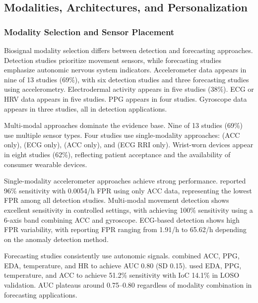 \subsection{Modalities, Architectures, and Personalization}

\subsubsection{Modality Selection and Sensor Placement}

Biosignal modality selection differs between detection and forecasting approaches. Detection studies prioritize movement sensors, while forecasting studies emphasize autonomic nervous system indicators. Accelerometer data appears in nine of 13 studies (69\%), with six detection studies and three forecasting studies using accelerometry. Electrodermal activity appears in five studies (38\%). ECG or HRV data appears in five studies. PPG appears in four studies. Gyroscope data appears in three studies, all in detection applications.

Multi-modal approaches dominate the evidence base. Nine of 13 studies (69\%) use multiple sensor types. Four studies use single-modality approaches: \textcite{spahrDeepLearningbasedDetection2025} (ACC only), \textcite{reintjesECGBasedDetectionEpileptic2025} (ECG only), \textcite{borujenyDetectionEpilepticSeizure2013} (ACC only), and \textcite{odeDevelopmentEpilepticSeizure2023} (ECG RRI only). Wrist-worn devices appear in eight studies (62\%), reflecting patient acceptance and the availability of consumer wearable devices.

Single-modality accelerometer approaches achieve strong performance. \textcite{spahrDeepLearningbasedDetection2025} reported 96\% sensitivity with 0.0054/h FPR using only ACC data, representing the lowest FPR among all detection studies. Multi-modal movement detection shows excellent sensitivity in controlled settings, with \textcite{fineDetectionKeyAutomated2025} achieving 100\% sensitivity using a 6-axis band combining ACC and gyroscope. ECG-based detection shows high FPR variability, with \textcite{reintjesECGBasedDetectionEpileptic2025} reporting FPR ranging from 1.91/h to 65.62/h depending on the anomaly detection method.

Forecasting studies consistently use autonomic signals. \textcite{nasseriAmbulatorySeizureForecasting2021} combined ACC, PPG, EDA, temperature, and HR to achieve AUC 0.80 (SD 0.15). \textcite{meiselMachineLearningWristband2020} used EDA, PPG, temperature, and ACC to achieve 51.2\% sensitivity with IoC 14.1\% in LOSO validation. AUC plateaus around 0.75--0.80 regardless of modality combination in forecasting applications.

